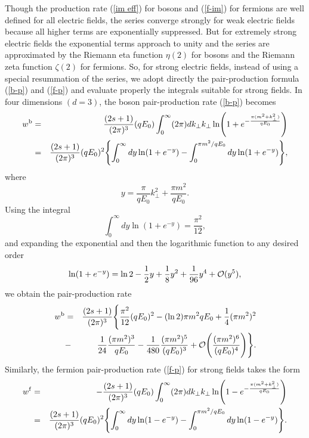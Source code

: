 \documentclass[a4paper,prd,showpacs,preprintnumbers,amsmath,amssymb]{revtex4}
\begin{document}
Though the production rate (\ref{im eff}) for bosons and
(\ref{f-im}) for fermions are well defined for all electric
fields, the series converge strongly for weak electric fields
because all higher terms are exponentially suppressed. But for
extremely strong electric fields the exponential terms approach to
unity and the series are approximated by the Riemann eta function
$\eta (2)$ for bosons and the Riemann zeta function $\zeta (2)$
for fermions. So, for strong electric fields, instead of using a
special resummation of the series, we adopt directly the
pair-production formula (\ref{b-p}) and (\ref{f-p}) and evaluate
properly the integrals suitable for strong fields. In four
dimensions $(d = 3)$, the boson pair-production rate (\ref{b-p})
becomes
\begin{eqnarray}
w^{\rm b} &=& \frac{(2s+1)}{(2 \pi)^3} (qE_0) \int_0^{\infty} (2
\pi) d k_{\perp} k_{\perp} \ln \Biggl(1 + e^{- \frac{\pi(m^2 +
k_{\perp}^2 )}{qE_0}} \Biggr) \nonumber\\ &=& \frac{(2s+1)}{(2
\pi)^3} (qE_0)^2 \Biggl\{\int_0^{\infty} dy \ln (1 + e^{-y}) -
\int_0^{\pi m^2/qE_0} dy \ln ( 1 + e^{-y}) \Biggr\},
\end{eqnarray}
where
\begin{equation}
y = \frac{\pi}{qE_0} k_{\perp}^2 + \frac{\pi m^2}{q E_0}.
\end{equation}
Using the integral \cite{pbm}
\begin{equation}
\int_0^{\infty} dy \ln (1 + e^{-y}) = \frac{\pi^2}{12},
\end{equation}
and expanding the exponential and then the logarithmic function to
any desired order
\begin{equation}
\ln ( 1 + e^{-y}) = \ln 2 - \frac{1}{2} y + \frac{1}{8} y^2 +
\frac{1}{96} y^4 + {\cal O} (y^5),
\end{equation}
we obtain the pair-production rate
\begin{eqnarray}
w^{\rm b} &=& \frac{(2s+1)}{(2 \pi)^3} \Biggl\{ \frac{\pi^2}{12}
(qE_0)^2 - (\ln 2) \pi m^2 q E_0 + \frac{1}{4} (\pi m^2)^2
\nonumber\\~~~~&-& \frac{1}{24} \frac{(\pi m^2)^3}{qE_0} -
\frac{1}{480} \frac{(\pi m^2)^5}{(qE_0)^3}  + {\cal O}
\Biggl(\frac{(\pi m^2)^6}{(qE_0)^4} \Biggr) \Biggr\}. \label{s
b-p}
\end{eqnarray}
Similarly, the fermion pair-production rate (\ref{f-p}) for strong
fields takes the form
\begin{eqnarray}
w^{\rm f} &=& - \frac{(2s+1)}{(2 \pi)^3} (qE_0) \int_0^{\infty} (2
\pi) d k_{\perp} k_{\perp} \ln \Biggl(1 - e^{- \frac{\pi(m^2 +
k_{\perp}^2 )}{qE_0}} \Biggr) \nonumber\\ &=& \frac{(2s+1)}{(2
\pi)^3} (qE_0)^2 \Biggl\{\int_0^{\infty} dy \ln (1 - e^{-y}) -
\int_0^{\pi m^2/qE_0} dy \ln ( 1 - e^{-y}) \Biggr\}.
\end{eqnarray}
\end{document}
